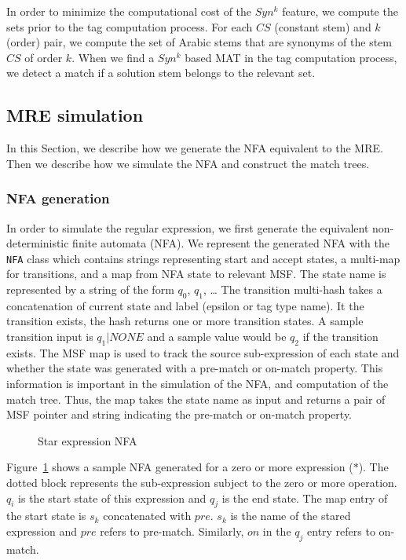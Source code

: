 In order to minimize the computational cost of the $Syn^k$ feature, we compute the sets prior to the tag computation process. 
For each $CS$ (constant stem) and $k$ (order) pair, we compute the set of Arabic stems that are synonyms of the stem $CS$ of order $k$. 
When we find a $Syn^k$ based MAT in the tag computation process, we detect a match if a solution stem belongs to the relevant set.

\subsection{MRE simulation}

In this Section, we describe how we generate the NFA equivalent to the MRE. 
Then we describe how we simulate the NFA and construct the match trees.

\subsubsection{NFA generation}

In order to simulate the regular expression, we first generate the equivalent non-deterministic finite automata (NFA). 
We represent the generated NFA with the {\tt NFA} class which contains strings representing start and accept states, a multi-map for transitions, and a map from NFA state to relevant MSF. 
The state name is represented by a string of the form $q_0$, $q_1$, \dots
The transition multi-hash takes a concatenation of current state and label (epsilon or tag type name). 
It the transition exists, the hash returns one or more transition states. 
A sample transition input is $q_1|NONE$ and a sample value would be $q_2$ if the transition exists. 
The MSF map is used to track the source sub-expression of each state and whether the state was generated with a pre-match or on-match property. 
This information is important in the simulation of the NFA, and computation of the match tree. 
Thus, the map takes the state name as input and returns a pair of MSF pointer and string indicating the pre-match or on-match property.

\begin{figure}[h!]
\centering
{}
\caption{Star expression NFA}
\label{fig:starnfa}
\end{figure}

Figure~\ref{fig:starnfa} shows a sample NFA generated for a zero or more expression ($*$). 
The dotted block represents the sub-expression subject to the zero or more operation. 
$q_i$ is the start state of this expression and $q_j$ is the end state. 
The map entry of the start state is $s_k$ concatenated with $pre$. 
$s_k$ is the name of the stared expression and $pre$ refers to pre-match. 
Similarly, $on$ in the $q_j$ entry refers to on-match.

